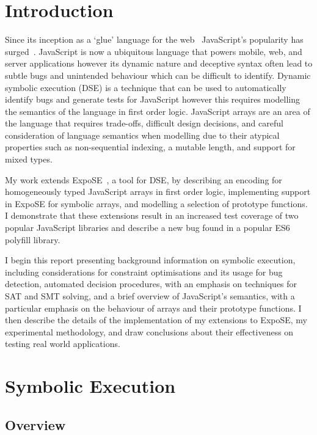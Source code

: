 \documentclass[]{final_report}
\begin{document}
\chapter{Introduction}
Since its inception as a `glue' language for the web~\cite{AZProgrammingLanguages} JavaScript's popularity has surged~\cite{stackoverflowsurvey,tiobeindex2017nov}. JavaScript is now a ubiquitous language that powers mobile, web, and server applications however its dynamic nature and deceptive syntax often lead to subtle bugs and unintended behaviour which can be difficult to identify. Dynamic symbolic execution (DSE) is a technique that can be used to automatically identify bugs and generate tests for JavaScript however this requires modelling the semantics of the language in first order logic. JavaScript arrays are an area of the language that requires trade-offs, difficult design decisions, and careful consideration of language semantics when modelling due to their atypical properties such as non-sequential indexing, a mutable length, and support for mixed types. 

My work extends ExpoSE~\cite{DBLP:conf/spin/2017}, a tool for DSE, by describing an encoding for homogeneously typed JavaScript arrays in first order logic, implementing support in ExpoSE for symbolic arrays, and modelling a selection of prototype functions. I demonstrate that these extensions result in an increased test coverage of two popular JavaScript libraries and describe a new bug found in a popular ES6 polyfill library.

I begin this report presenting background information on symbolic execution, including considerations for constraint optimisations and its usage for bug detection, automated decision procedures, with an emphasis on techniques for SAT and SMT solving, and a brief overview of JavaScript's semantics, with a particular emphasis on the behaviour of arrays and their prototype functions. I then describe the details of the implementation of my extensions to ExpoSE, my experimental methodology, and draw conclusions about their effectiveness on testing real world applications.

\chapter{Symbolic Execution}

\section{Overview}
\end{document}
